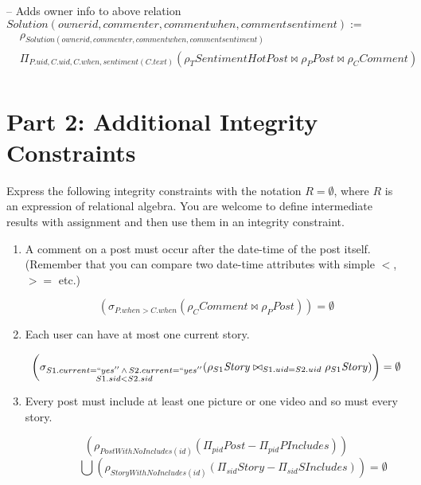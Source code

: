 \documentclass{article}
\newcommand{\var}[1]{\mathit{#1}}
\begin{document}
\begin{enumerate}
{-- Adds owner info to above relation \\
$\var{Solution}(ownerid, commenter, commentwhen, commentsentiment) :=$
\begin{align*}
    &\rho_{\var{Solution}(ownerid, commenter, commentwhen, commentsentiment)}\\ 
    &\Pi_{P.uid, C.uid, C.when, sentiment(C.text)}
    (\rho_{T} \var{SentimentHotPost} \bowtie \rho_{P} \var{Post} \bowtie \rho_{C} \var{Comment})\\
\end{align*}



}

\end{enumerate}



\section*{Part 2: Additional Integrity Constraints}


Express the following integrity constraints
with the notation $R = \emptyset$, where $R$ is an expression of relational algebra. 
You are welcome to define intermediate results with assignment
and then use them in an integrity constraint.

\begin{enumerate}

\item   %
A comment on a post must occur after the date-time of the post itself.
(Remember that you can compare two date-time attributes with simple $<$,
$>=$ etc.)

{\large  

\[
    \left( 
        \sigma_{P.when > C.when}
        (\rho_{C}\var{Comment} \bowtie \rho_{P} \var{Post})    
    \right)
    =\emptyset
\]

}

\item %
Each user can have at most one current story.


{\large 

\[
    \left(
    \sigma_{
        \substack{
            S1.current=``yes''\,\land\, S2.current=``yes'' \\ 
            S1.sid < S2.sid
        }
    }
    (\rho_{S1}\var{Story} \bowtie_{S1.uid=S2.uid} \rho_{S1} \var{Story})
    \right) = \emptyset
\]
}

\item %
Every post must include at least one picture or one video and so must every story.

{\large 

\[
    \left(
        \rho_{\var{PostWithNoIncludes}(id)}
        (\Pi_{pid} \var{Post} - \Pi_{pid} \var{PIncludes})
    \right)
\]
\[
    \quad \quad \quad \bigcup
    \left(
        \rho_{\var{StoryWithNoIncludes}(id)}
        (\Pi_{sid} \var{Story} - \Pi_{sid} \var{SIncludes})
    \right)
    = \emptyset
\]
}

\end{enumerate}
\end{document}
